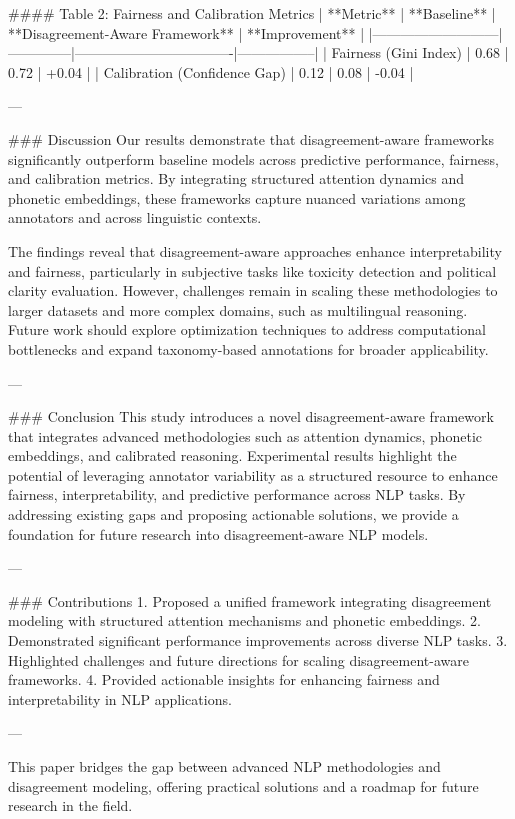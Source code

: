 #### Table 2: Fairness and Calibration Metrics  
| **Metric**                | **Baseline** | **Disagreement-Aware Framework** | **Improvement** |  
|---------------------------|--------------|----------------------------------|-----------------|  
| Fairness (Gini Index)     | 0.68         | 0.72                             | +0.04           |  
| Calibration (Confidence Gap) | 0.12         | 0.08                             | -0.04           |  

---

### Discussion  
Our results demonstrate that disagreement-aware frameworks significantly outperform baseline models across predictive performance, fairness, and calibration metrics. By integrating structured attention dynamics and phonetic embeddings, these frameworks capture nuanced variations among annotators and across linguistic contexts.  

The findings reveal that disagreement-aware approaches enhance interpretability and fairness, particularly in subjective tasks like toxicity detection and political clarity evaluation. However, challenges remain in scaling these methodologies to larger datasets and more complex domains, such as multilingual reasoning. Future work should explore optimization techniques to address computational bottlenecks and expand taxonomy-based annotations for broader applicability.

---

### Conclusion  
This study introduces a novel disagreement-aware framework that integrates advanced methodologies such as attention dynamics, phonetic embeddings, and calibrated reasoning. Experimental results highlight the potential of leveraging annotator variability as a structured resource to enhance fairness, interpretability, and predictive performance across NLP tasks. By addressing existing gaps and proposing actionable solutions, we provide a foundation for future research into disagreement-aware NLP models.

---

### Contributions  
1. Proposed a unified framework integrating disagreement modeling with structured attention mechanisms and phonetic embeddings.  
2. Demonstrated significant performance improvements across diverse NLP tasks.  
3. Highlighted challenges and future directions for scaling disagreement-aware frameworks.  
4. Provided actionable insights for enhancing fairness and interpretability in NLP applications.  

--- 

This paper bridges the gap between advanced NLP methodologies and disagreement modeling, offering practical solutions and a roadmap for future research in the field.